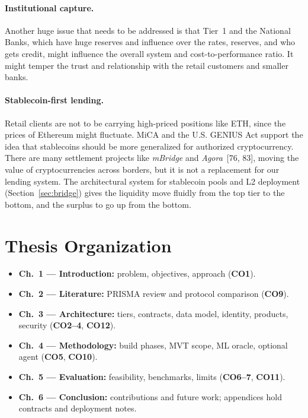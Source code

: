 \documentclass[12pt, a4paper]{report}
\begin{document}
\paragraph{Institutional capture.} Another huge issue that needs to be addressed is that Tier~1 and the National Banks, which have huge reserves and influence over the rates, reserves, and who gets credit, might influence the overall system and cost-to-performance ratio. It might temper the trust and relationship with the retail customers and smaller banks.

\paragraph{Stablecoin-first lending.}
\label{sec:stablecoin-first}
Retail clients are not to be carrying high-priced positions like ETH, since the prices of Ethereum might fluctuate. MiCA and the U.S. GENIUS Act support the idea that stablecoins should be more generalized for authorized cryptocurrency. There are many settlement projects like \textit{mBridge} and \textit{Agora}~[76, 83], moving the value of cryptocurrencies across borders, but it is not a replacement for our lending system. The architectural system for stablecoin pools and L2 deployment (Section~\ref{sec:bridge}) gives the liquidity move fluidly from the top tier to the bottom, and the surplus to go up from the bottom.

\section{Thesis Organization}
\label{sec:thesis-organization}

\begin{itemize}[noitemsep]
\item \textbf{Ch.~1 --- Introduction:} problem, objectives, approach (\textbf{CO1}).
\item \textbf{Ch.~2 --- Literature:} PRISMA review and protocol comparison (\textbf{CO9}).
\item \textbf{Ch.~3 --- Architecture:} tiers, contracts, data model, identity, products, security (\textbf{CO2--4}, \textbf{CO12}).
\item \textbf{Ch.~4 --- Methodology:} build phases, MVT scope, ML oracle, optional agent (\textbf{CO5}, \textbf{CO10}).
\item \textbf{Ch.~5 --- Evaluation:} feasibility, benchmarks, limits (\textbf{CO6--7}, \textbf{CO11}).
\item \textbf{Ch.~6 --- Conclusion:} contributions and future work; appendices hold contracts and deployment notes.
\end{itemize}
\end{document}
